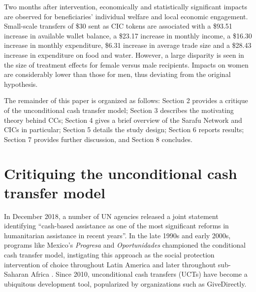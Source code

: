 \documentclass[12pt]{article}
\begin{document}
Two months after intervention, economically and statistically significant impacts are observed for beneficiaries’ individual welfare and local economic engagement. Small-scale transfers of \$30 sent as CIC tokens are associated with a \$93.51 increase in available wallet balance, a \$23.17 increase in monthly income, a \$16.30 increase in monthly expenditure, \$6.31 increase in average trade size and a \$28.43 increase in expenditure on food and water. However, a large disparity is seen in the size of treatment effects for female versus male recipients. Impacts on women are considerably lower than those for men, thus deviating from the original hypothesis.

The remainder of this paper is organized as follows: Section 2 provides a critique of the unconditional cash transfer model; Section 3 describes the motivating theory behind CCs; Section 4 gives a brief overview of the Sarafu Network and CICs in particular; Section 5 details the study design; Section 6 reports results; Section 7 provides further discussion, and Section 8 concludes.


\section{Critiquing the unconditional cash transfer model} \label{sec:section2}
In December 2018, a number of UN agencies released a joint statement identifying “cash-based assistance as one of the most significant reforms in humanitarian assistance in recent years”. In the late 1990s and early 2000s, programs like Mexico’s \textit{Progresa} and \textit{Oportunidades} championed the conditional cash transfer model, instigating this approach as the social protection intervention of choice throughout Latin America \citep{handa2006experience} and later throughout sub-Saharan Africa \citep{davis2016evidence}. Since 2010, unconditional cash transfers (UCTs) have become a ubiquitous development tool, popularized by organizations such as GiveDirectly.
\end{document}
